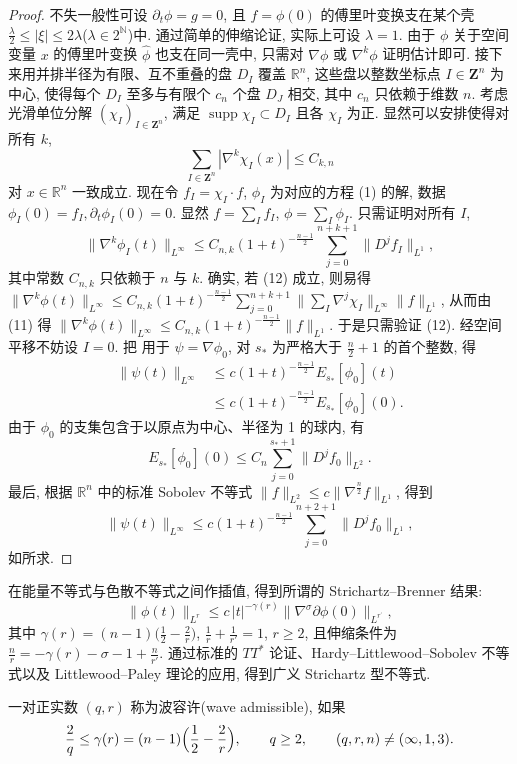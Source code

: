 \begin{proof}
不失一般性可设 $\partial_t \phi = g = 0$, 且 $f = \phi(0)$ 的傅里叶变换支在某个壳 $\frac{\lambda}{2} \leq |\xi| \leq 2\lambda$($\lambda \in 2^{\mathbb{N}}$)中. 通过简单的伸缩论证, 实际上可设 $\lambda = 1$. 由于 $\phi$ 关于空间变量 $x$ 的傅里叶变换 $\hat{\phi}$ 也支在同一壳中, 只需对 $\nabla \phi$ 或 $\nabla^k \phi$ 证明估计即可. 接下来用并排半径为有限、互不重叠的盘 $D_I$ 覆盖 $\mathbb{R}^n$, 这些盘以整数坐标点 $I \in \mathbf{Z}^n$ 为中心, 使得每个 $D_I$ 至多与有限个 $c_n$ 个盘 $D_J$ 相交, 其中 $c_n$ 只依赖于维数 $n$. 考虑光滑单位分解 $(\chi_I)_{I\in\mathbf{Z}^n}$, 满足 $\operatorname{supp}\chi_I\subset D_I$ 且各 $\chi_I$ 为正. 显然可以安排使得对所有 $k$,
\[
\sum_{I\in\mathbf{Z}^{n}}|\nabla^{k}\chi_{I}(x)|\leq C_{k,n}
\]
对 $x \in \mathbb{R}^n$ 一致成立. 现在令 $f_I = \chi_I \cdot f$, $\phi_I$ 为对应的方程 (1) 的解, 数据 $\phi_I(0) = f_I, \partial_t \phi_I(0) = 0$. 显然 $f = \sum_I f_I$, $\phi = \sum_I \phi_I$. 只需证明对所有 $I$,
\[
\|\nabla^{k}\phi_{I}(t)\|_{L^{\infty}}\leq C_{n,k}(1+t)^{-\frac{n-1}{2}}\sum_{j=0}^{n+k+1}\|D^{j}f_{I}\|_{L^{1}},
\]
其中常数 $C_{n,k}$ 只依赖于 $n$ 与 $k$. 确实, 若 (12) 成立, 则易得 $\|\nabla^{k}\phi(t)\|_{L^\infty} \leq C_{n,k}(1+t)^{-\frac{n-1}{2}} \sum_{j=0}^{n+k+1} \|\sum_{I} \nabla^{j}\chi_{I}\|_{L^\infty} \|f\|_{L^{1}}$, 从而由 (11) 得 $\|\nabla^{k}\phi(t)\|_{L^\infty} \leq C_{n,k}(1+t)^{-\frac{n-1}{2}} \|f\|_{L^{1}}$.
于是只需验证 (12). 经空间平移不妨设 $I = 0$. 把 用于 $\psi = \nabla \phi_0$, 对 $s_*$ 为严格大于 $\frac{n}{2} + 1$ 的首个整数, 得
\[
\begin{aligned}
\|\psi(t)\|_{L^{\infty}}&\leq c(1+t)^{-\frac{n-1}{2}}E_{s_{*}}[\phi_{0}](t)\\
&\leq c(1+t)^{-\frac{n-1}{2}}E_{s_{*}}[\phi_{0}](0).\end{aligned}
\]
由于 $\phi_{0}$ 的支集包含于以原点为中心、半径为 1 的球内, 有
\[
E_{s_{*}}[\phi_{0}](0)\leq C_{n}\sum_{j=0}^{s_{*}+1}\|D^{j}f_{0}\|_{L^{2}}.
\]
最后, 根据 $\mathbb{R}^n$ 中的标准 Sobolev 不等式 $\|f\|_{L^2} \leq c\|\nabla^{\frac{n}{2}}f\|_{L^1}$, 得到
\[
\|\psi(t)\|_{L^{\infty}}\leq c(1+t)^{-\frac{n-1}{2}}\sum_{j=0}^{n+2+1}\|D^{j}f_{0}\|_{L^{1}},
\]
如所求.\end{proof}

在能量不等式与色散不等式之间作插值, 得到所谓的 Strichartz--Brenner 结果:
\begin{equation}
\|\phi(t)\|_{L^{r}}\leq c\,|t|^{-\gamma(r)}\|\nabla^{\sigma}\partial\phi(0)\|_{L^{r^{\prime}}},\end{equation}
其中 $\gamma(r) = (n-1)\bigl(\frac{1}{2}-\frac{2}{r}\bigr)$, $\frac{1}{r}+\frac{1}{r'}=1$, $r\geq2$, 且伸缩条件为 $\frac{n}{r}=-\gamma(r)-\sigma-1+\frac{n}{r'}$. 通过标准的 $TT^{*}$ 论证、Hardy--Littlewood--Sobolev 不等式以及 Littlewood--Paley 理论的应用, 得到广义 Strichartz 型不等式.
\begin{definition}\label{def:1.10}
一对正实数 $(q, r)$ 称为波容许(wave admissible), 如果
\[
\frac{2}{q}\leq\gamma(r)=(n-1)\Bigl(\frac{1}{2}-\frac{2}{r}\Bigr),\qquad q\geq2,\qquad(q,r,n)\neq(\infty,1,3).
\]
\end{definition}

